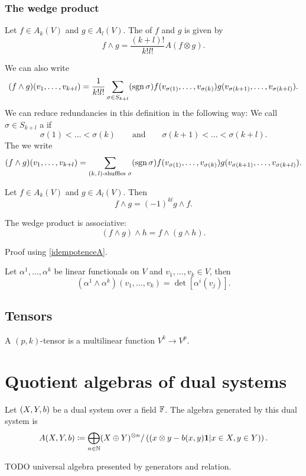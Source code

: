 \subsubsection{The wedge product}
\begin{definition}
Let $f\in A_k(V)$ and $g\in A_l(V)$. The  of $f$ and $g$ is given by
\[ f\wedge g = \frac{(k+l)!}{k!l!}A(f\otimes g). \]
\end{definition}
We can also write
\[ (f\wedge g)(v_1,\ldots,v_{k+l}) = \frac{1}{k!l!}\sum_{\sigma\in S_{k+l}}(\operatorname{sgn} \sigma)f(v_{\sigma(1)},\ldots,v_{\sigma(k)})g(v_{\sigma(k+1)},\ldots, v_{\sigma(k+l)}). \]
We can reduce redundancies in this definition in the following way:
We call $\sigma\in S_{k+l}$ a  if
\[ \sigma(1)<\ldots<\sigma(k) \qquad \text{and}\qquad \sigma(k+1)<\ldots<\sigma(k+l). \]
The we write
\[ (f\wedge g)(v_1,\ldots,v_{k+l}) = \sum_{\text{$(k,l)$-shuffles $\sigma$}}(\operatorname{sgn} \sigma)f(v_{\sigma(1)},\ldots,v_{\sigma(k)})g(v_{\sigma(k+1)},\ldots, v_{\sigma(k+l)}). \]
\begin{proposition}
Let $f\in A_k(V)$ and $g\in A_l(V)$. Then
\[ f\wedge g = (-1)^{kl}g\wedge f. \]
\end{proposition}
\begin{lemma}
The wedge product is associative:
\[ (f\wedge g)\wedge h = f\wedge (g\wedge h). \]
\end{lemma}
Proof using \ref{idempotenceA}.

\begin{lemma}
Let $\alpha^1,\ldots, \alpha^k$ be linear functionals on $V$ and $v_1,\ldots,v_k\in V$, then
\[ (\alpha^1\wedge\alpha^k)(v_1,\ldots, v_k) = \det[\alpha^i(v_j)]. \]
\end{lemma}

\subsection{Tensors}
A $(p,k)$-tensor is a multilinear function $V^k\to V^p$.

\section{Quotient algebras of dual systems}
\begin{definition}
Let $\sSet{X,Y,b}$ be a dual system over a field $\mathbb{F}$. The algebra generated by this dual system is
\[ A(X,Y,b) \coloneqq \bigoplus_{n\in\mathbb{N}}(X\oplus Y)^{\otimes n}/\left(\left(x\otimes y - b(x,y)\boldsymbol{\mathrm{1}}\middle|x\in X, y\in Y\right)\right). \]
\end{definition}
TODO universal algebra presented by generators and relation.

